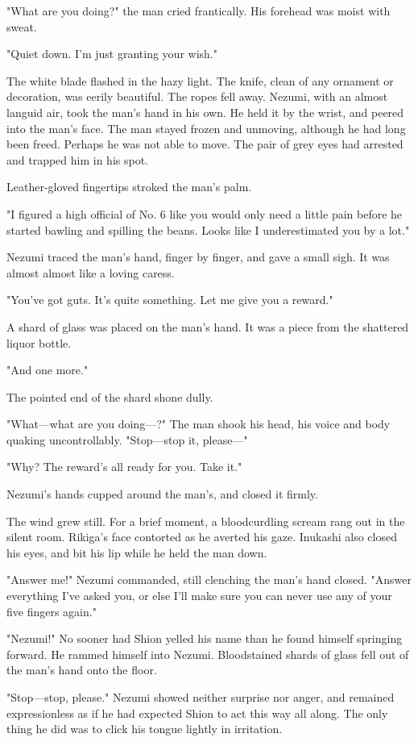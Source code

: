 "What are you doing?" the man cried frantically. His forehead was moist
with sweat.

"Quiet down. I'm just granting your wish."

The white blade flashed in the hazy light. The knife, clean of any
ornament or decoration, was eerily beautiful. The ropes fell away.
Nezumi, with an almost languid air, took the man's hand in his own. He
held it by the wrist, and peered into the man's face. The man stayed
frozen and unmoving, although he had long been freed. Perhaps he was not
able to move. The pair of grey eyes had arrested and trapped him in his
spot.

Leather-gloved fingertips stroked the man's palm.

"I figured a high official of No. 6 like you would only need a little
pain before he started bawling and spilling the beans. Looks like I
underestimated you by a lot."

Nezumi traced the man's hand, finger by finger, and gave a small sigh.
It was almost almost like a loving caress.

"You've got guts. It's quite something. Let me give you a reward."

A shard of glass was placed on the man's hand. It was a piece from the
shattered liquor bottle.

"And one more."

The pointed end of the shard shone dully.

"What---what are you doing---?" The man shook his head, his voice and body
quaking uncontrollably. "Stop---stop it, please---"

"Why? The reward's all ready for you. Take it."

Nezumi's hands cupped around the man's, and closed it firmly.

The wind grew still. For a brief moment, a bloodcurdling scream rang out
in the silent room. Rikiga's face contorted as he averted his gaze.
Inukashi also closed his eyes, and bit his lip while he held the man
down.

"Answer me!" Nezumi commanded, still clenching the man's hand closed.
"Answer everything I've asked you, or else I'll make sure you can never
use any of your five fingers again."

"Nezumi!" No sooner had Shion yelled his name than he found himself
springing forward. He rammed himself into Nezumi. Bloodstained shards of
glass fell out of the man's hand onto the floor.

"Stop---stop, please." Nezumi showed neither surprise nor anger, and
remained expressionless as if he had expected Shion to act this way all
along. The only thing he did was to click his tongue lightly in
irritation.

